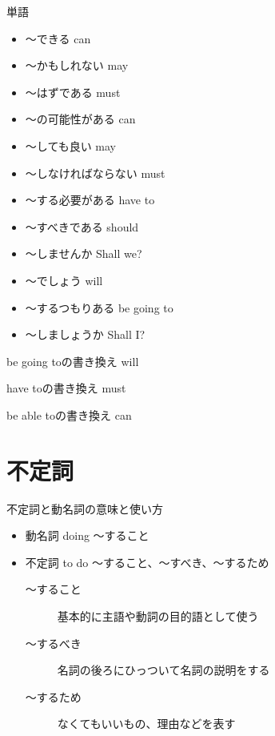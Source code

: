 \documentclass[10pt]{jsarticle}
\newcommand{\answer}[2]{{\color{orange}#2}}
\newcommand{\answer}[2]{\vspace{#1mm}}
\begin{document}
\begin{itembox}[l]{単語}

	\begin{multicols}{2}
		\begin{itemize}
			\item 〜できる \answer{5}{can}
			\item 〜かもしれない \answer{5}{may}
			\item 〜はずである \answer{5}{must}
			\item 〜の可能性がある \answer{5}{can}
			\item 〜しても良い \answer{5}{may}
			\item 〜しなければならない \answer{5}{must}
			\item 〜する必要がある \answer{5}{have to}
			\item 〜すべきである \answer{5}{should}
			\item 〜しませんか \answer{5}{Shall we?}
			\item 〜でしょう \answer{5}{will}
			\item 〜するつもりある \answer{5}{be going to}
			\item 〜しましょうか \answer{5}{Shall I?}
		\end{itemize}
	\end{multicols}
\end{itembox}


\begin{multicols}{2}
	\begin{itembox}[l]{be going toの書き換え}
		\answer{8}{will}
	\end{itembox}
	\begin{itembox}[l]{have toの書き換え}
		\answer{8}{must}
	\end{itembox}
	\begin{itembox}[l]{be able toの書き換え}
		\answer{8}{can}
	\end{itembox}
\end{multicols}



\section{不定詞}

\begin{itembox}[l]{不定詞と動名詞の意味と使い方}
	\answer{8}{
		\begin{itemize}
			\item 動名詞 doing 〜すること
			\item 不定詞 to do 〜すること、〜すべき、〜するため
			      \begin{description}
				      \item[〜すること] 基本的に主語や動詞の目的語として使う
				      \item[〜するべき] 名詞の後ろにひっついて名詞の説明をする
				      \item[〜するため] なくてもいいもの、理由などを表す
			      \end{description}
		\end{itemize}
	}
\end{itembox}
\end{document}
